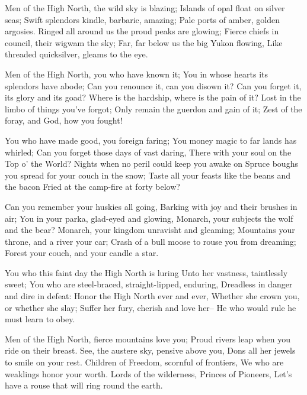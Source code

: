 
\begin{poemblock}
 Men of the High North, the wild sky is blazing;
  Islands of opal float on silver seas;
 Swift splendors kindle, barbaric, amazing;
  Pale ports of amber, golden argosies.
 Ringed all around us the proud peaks are glowing;
  Fierce chiefs in council, their wigwam the sky;
 Far, far below us the big Yukon flowing,
  Like threaded quicksilver, gleams to the eye.

 Men of the High North, you who have known it;
  You in whose hearts its splendors have abode;
 Can you renounce it, can you disown it?
  Can you forget it, its glory and its goad?
 Where is the hardship, where is the pain of it?
  Lost in the limbo of things you've forgot;
 Only remain the guerdon and gain of it;
  Zest of the foray, and God, how you fought!

 You who have made good, you foreign faring;
  You money magic to far lands has whirled;
 Can you forget those days of vast daring,
  There with your soul on the Top o' the World?
 Nights when no peril could keep you awake on
  Spruce boughs you spread for your couch in the snow;
 Taste all your feasts like the beans and the bacon
  Fried at the camp-fire at forty below?

 Can you remember your huskies all going,
  Barking with joy and their brushes in air;
 You in your parka, glad-eyed and glowing,
  Monarch, your subjects the wolf and the bear?
 Monarch, your kingdom unravisht and gleaming;
  Mountains your throne, and a river your car;
 Crash of a bull moose to rouse you from dreaming;
  Forest your couch, and your candle a star.

 You who this faint day the High North is luring
  Unto her vastness, taintlessly sweet;
 You who are steel-braced, straight-lipped, enduring,
  Dreadless in danger and dire in defeat:
 Honor the High North ever and ever,
  Whether she crown you, or whether she slay;
 Suffer her fury, cherish and love her--
  He who would rule he must learn to obey.

 Men of the High North, fierce mountains love you;
  Proud rivers leap when you ride on their breast.
 See, the austere sky, pensive above you,
  Dons all her jewels to smile on your rest.
 Children of Freedom, scornful of frontiers,
  We who are weaklings honor your worth.
 Lords of the wilderness, Princes of Pioneers,
  Let's have a rouse that will ring round the earth.
\end{poemblock}
